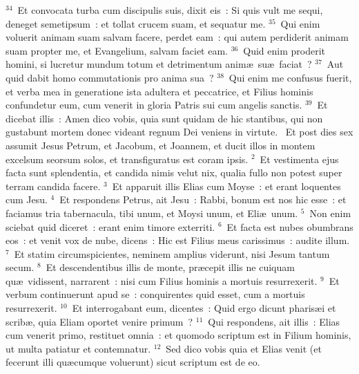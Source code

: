 ${}^{34}$~Et convocata turba cum discipulis suis, dixit eis~: Si quis vult me sequi, deneget semetipsum~: et tollat crucem suam, et sequatur me.
${}^{35}$~Qui enim voluerit animam suam salvam facere, perdet eam~: qui autem perdiderit animam suam propter me, et Evangelium, salvam faciet eam.
${}^{36}$~Quid enim proderit homini, si lucretur mundum totum et detrimentum anim\ae\ su\ae\ faciat~?
${}^{37}$~Aut quid dabit homo commutationis pro anima sua~?
${}^{38}$~Qui enim me confusus fuerit, et verba mea in generatione ista adultera et peccatrice, et Filius hominis confundetur eum, cum venerit in gloria Patris sui cum angelis sanctis.
${}^{39}$~Et dicebat illis~: Amen dico vobis, quia sunt quidam de hic stantibus, qui non gustabunt mortem donec videant regnum Dei veniens in virtute.
~\lettrine[lines=10,image=true,loversize=0.05,lraise=-0.03]{E}{}t post dies sex assumit Jesus Petrum, et Jacobum, et Joannem, et ducit illos in montem excelsum seorsum solos, et transfiguratus est coram ipsis.
${}^{2}$~Et vestimenta ejus facta sunt splendentia, et candida nimis velut nix, qualia fullo non potest super terram candida facere.
${}^{3}$~Et apparuit illis Elias cum Moyse~: et erant loquentes cum Jesu.
${}^{4}$~Et respondens Petrus, ait Jesu~: Rabbi, bonum est nos hic esse~: et faciamus tria tabernacula, tibi unum, et Moysi unum, et Eli\ae\ unum.
${}^{5}$~Non enim sciebat quid diceret~: erant enim timore exterriti.
${}^{6}$~Et facta est nubes obumbrans eos~: et venit vox de nube, dicens~: Hic est Filius meus carissimus~: audite illum.
${}^{7}$~Et statim circumspicientes, neminem amplius viderunt, nisi Jesum tantum secum.
${}^{8}$~Et descendentibus illis de monte, pr\ae cepit illis ne cuiquam qu\ae\ vidissent, narrarent~: nisi cum Filius hominis a mortuis resurrexerit.
${}^{9}$~Et verbum continuerunt apud se~: conquirentes quid esset, cum a mortuis resurrexerit.
${}^{10}$~Et interrogabant eum, dicentes~: Quid ergo dicunt pharis\ae i et scrib\ae , quia Eliam oportet venire primum~?
${}^{11}$~Qui respondens, ait illis~: Elias cum venerit primo, restituet omnia~: et quomodo scriptum est in Filium hominis, ut multa patiatur et contemnatur.
${}^{12}$~Sed dico vobis quia et Elias venit (et fecerunt illi qu\ae cumque voluerunt) sicut scriptum est de eo.


